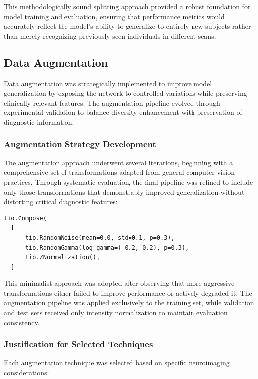 \documentclass[12pt, a4paper]{article}
\begin{document}
This methodologically sound splitting approach provided a robust foundation for model training and evaluation, ensuring that performance metrics would accurately reflect the model's ability to generalize to entirely new subjects rather than merely recognizing previously seen individuals in different scans.

\subsection{Data Augmentation}

Data augmentation was strategically implemented to improve model generalization by exposing the network to controlled variations while preserving clinically relevant features. The augmentation pipeline evolved through experimental validation to balance diversity enhancement with preservation of diagnostic information.

\subsubsection{Augmentation Strategy Development}

The augmentation approach underwent several iterations, beginning with a comprehensive set of transformations adapted from general computer vision practices. Through systematic evaluation, the final pipeline was refined to include only those transformations that demonstrably improved generalization without distorting critical diagnostic features:

\begin{verbatim}
tio.Compose(
  [
      tio.RandomNoise(mean=0.0, std=0.1, p=0.3),
      tio.RandomGamma(log_gamma=(-0.2, 0.2), p=0.3),
      tio.ZNormalization(),
  ]
\end{verbatim}

This minimalist approach was adopted after observing that more aggressive transformations either failed to improve performance or actively degraded it. The augmentation pipeline was applied exclusively to the training set, while validation and test sets received only intensity normalization to maintain evaluation consistency.

\subsubsection{Justification for Selected Techniques}

Each augmentation technique was selected based on specific neuroimaging considerations:
\end{document}
